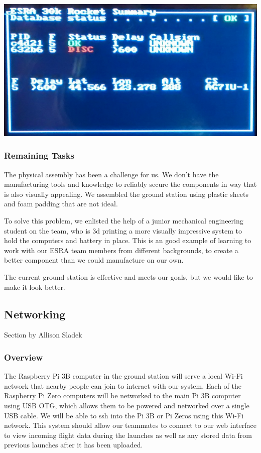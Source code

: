 \documentclass[onecolumn, draftclsnofoot, 10pt, compsoc]{IEEEtran}
\begin{document}
\begin{center}
	\includegraphics[width=.5\textwidth]{images/monitor.eps}
    \label{gs-monitor}
\end{center}

\subsubsection{Remaining Tasks}
The physical assembly has been a challenge for us.  We don't have the manufacturing tools and knowledge to reliably secure the components in way that is also visually appealing.  We assembled the ground station using plastic sheets and foam padding that are not ideal.

To solve this problem, we enlisted the help of a junior mechanical engineering student on the team, who is 3d printing a more visually impressive system to hold the computers and battery in place.  This is an good example of learning to work with our ESRA team members from different backgrounds, to create a better component than we could manufacture on our own.

The current ground station is effective and meets our goals, but we would like to make it look better.


\subsection{Networking}
Section by Allison Sladek

\subsubsection{Overview}
The Raspberry Pi 3B computer in the ground station will serve a local Wi-Fi network that nearby people can join to interact with our system. 
Each of the Raspberry Pi Zero computers will be networked to the main Pi 3B computer using USB OTG, which allows them to be powered and networked over a single USB cable.  
We will be able to ssh into the Pi 3B or Pi Zeros using this Wi-Fi network. 
This system should allow our teammates to connect to our web interface to view incoming flight data during the launches as well as any stored data from previous launches after it has been uploaded. 
\end{document}
